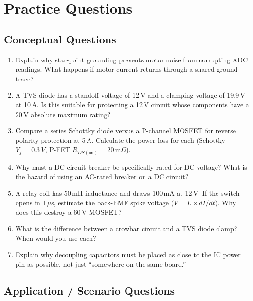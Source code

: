 \section{Practice Questions}
\label{sec:practice}

\subsection{Conceptual Questions}

\begin{enumerate}[leftmargin=1.5em]
  \item Explain why star-point grounding prevents motor noise from corrupting ADC readings. What happens if motor current returns through a shared ground trace?

  \item A TVS diode has a standoff voltage of 12\,V and a clamping voltage of 19.9\,V at 10\,A. Is this suitable for protecting a 12\,V circuit whose components have a 20\,V absolute maximum rating?

  \item Compare a series Schottky diode versus a P-channel MOSFET for reverse polarity protection at 5\,A. Calculate the power loss for each (Schottky $V_f = 0.3\,V$, P-FET $R_{DS(\text{on})} = 20\,\text{m}\Omega$).

  \item Why must a DC circuit breaker be specifically rated for DC voltage? What is the hazard of using an AC-rated breaker on a DC circuit?

  \item A relay coil has 50\,mH inductance and draws 100\,mA at 12\,V. If the switch opens in 1\,$\mu$s, estimate the back-EMF spike voltage ($V = L \times dI/dt$). Why does this destroy a 60\,V MOSFET?

  \item What is the difference between a crowbar circuit and a TVS diode clamp? When would you use each?

  \item Explain why decoupling capacitors must be placed as close to the IC power pin as possible, not just ``somewhere on the same board.''
\end{enumerate}

\subsection{Application / Scenario Questions}

